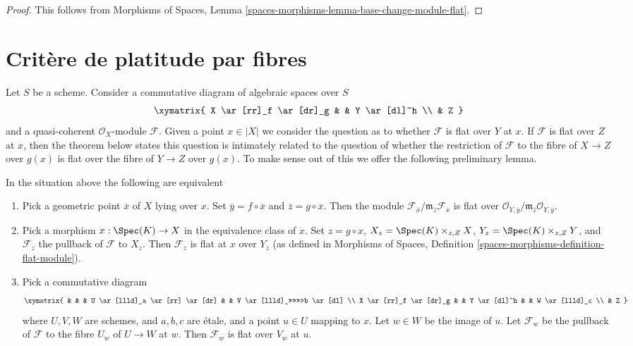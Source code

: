 \begin{proof}
This follows from
Morphisms of Spaces, Lemma
\ref{spaces-morphisms-lemma-base-change-module-flat}.
\end{proof}












\section{Crit\`ere de platitude par fibres}
\label{section-criterion-flat-fibres}

\noindent
Let $S$ be a scheme. Consider a commutative diagram of algebraic spaces
over $S$
$$
\xymatrix{
X \ar[rr]_f \ar[dr]_g & & Y \ar[dl]^h \\
& Z
}
$$
and a quasi-coherent $\mathcal{O}_X$-module $\mathcal{F}$.
Given a point $x \in |X|$ we consider the question as to whether
$\mathcal{F}$ is flat over $Y$ at $x$. If $\mathcal{F}$ is flat
over $Z$ at $x$, then the theorem below states this question is
intimately related to the question of whether the restriction of
$\mathcal{F}$ to the fibre of $X \to Z$ over $g(x)$
is flat over the fibre of $Y \to Z$ over $g(x)$. To make sense
out of this we offer the following preliminary lemma.

\begin{lemma}
\label{lemma-flat-on-fibres-at-point}
In the situation above the following are equivalent
\begin{enumerate}
\item Pick a geometric point $\overline{x}$ of $X$ lying over $x$.
Set $\overline{y} = f \circ \overline{x}$ and
$\overline{z} = g \circ \overline{x}$. Then the module
$\mathcal{F}_{\overline{x}}/
\mathfrak m_{\overline{z}}\mathcal{F}_{\overline{x}}$
is flat over
$\mathcal{O}_{Y, \overline{y}}/
\mathfrak m_{\overline{z}}\mathcal{O}_{Y, \overline{y}}$.
\item Pick a morphism $x : \Spec(K) \to X$ in the equivalence class of
$x$. Set $z = g \circ x$, $X_z = \Spec(K) \times_{z, Z} X$,
$Y_z = \Spec(K) \times_{z, Z} Y$, and $\mathcal{F}_z$ the pullback
of $\mathcal{F}$ to $X_z$. Then $\mathcal{F}_z$ is flat at $x$ over
$Y_z$ (as defined in Morphisms of Spaces,
Definition \ref{spaces-morphisms-definition-flat-module}).
\item Pick a commutative diagram
$$
\xymatrix{
& & & U \ar[llld]_a \ar[rr] \ar[dr] & & V \ar[llld]_>>>>>>>b \ar[dl] \\
X \ar[rr]_f \ar[dr]_g & & Y \ar[dl]^h &  & W \ar[llld]_c \\
& Z
}
$$
where $U, V, W$ are schemes, and $a, b, c$ are \'etale,
and a point $u \in U$ mapping to $x$. Let $w \in W$ be the image of
$u$. Let $\mathcal{F}_w$ be the pullback of $\mathcal{F}$ to
the fibre $U_w$ of $U \to W$ at $w$. Then $\mathcal{F}_w$
is flat over $V_w$ at $u$.
\end{enumerate}
\end{lemma}

